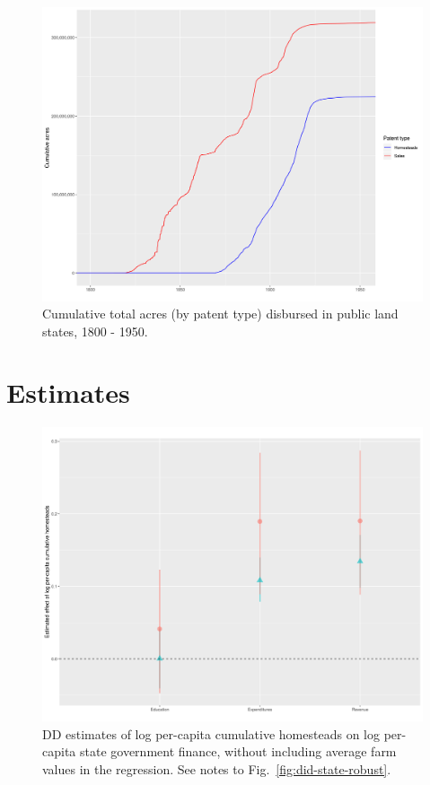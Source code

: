 \documentclass[12pt]{article}
\begin{document}
\begin{figure}[htbp]
	\begin{center}
		\includegraphics[width=\textwidth]{plots/acres-time.png}
	\end{center}
	\caption{Cumulative total acres (by patent type) disbursed in public land states, 1800 - 1950. \label{acres-time}} 
\end{figure}

\pagebreak
\section{Estimates}


\begin{figure}[htbp]
\begin{center}
		\includegraphics[width=\textwidth]{plots/did-state.png}
\end{center}
\caption{DD estimates of log per-capita cumulative homesteads on log per-capita state government finance, without including average farm values in the regression. See notes to Fig.~\ref{fig:did-state-robust}. \label{fig:did-state}}
\end{figure}	
\end{document}
